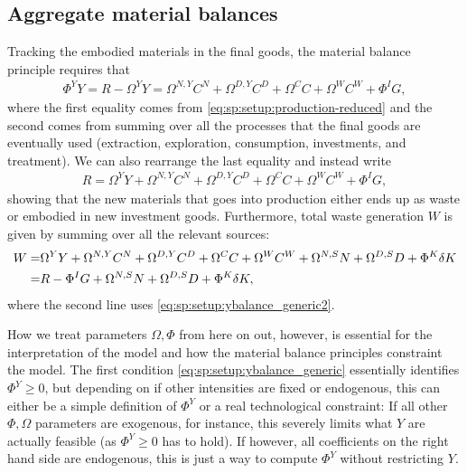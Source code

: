 \subsection{Aggregate material balances}
\label{sec:sp:setup:aggregatematerial}
Tracking the embodied materials in the final goods, the material balance principle requires that
\begin{align}
    \Phi^Y Y = R - \Omega^Y Y = \Omega^{N,Y}C^N + \Omega^{D,Y}C^D + \Omega^C C + \Omega^W C^W +\Phi^I G, \label{eq:sp:setup:ybalance_generic}
\end{align}
where the first equality comes from \eqref{eq:sp:setup:production-reduced} and the second comes from summing over all the processes that the final goods are eventually used (extraction, exploration, consumption, investments, and treatment). We can also rearrange the last equality and instead write
\begin{align}
    R =  \Omega^Y Y + \Omega^{N,Y}C^N + \Omega^{D,Y}C^D + \Omega^C C + \Omega^W C^W + \Phi^I G \label{eq:sp:setup:ybalance_generic2},
\end{align}
showing that the new materials that goes into production either ends up as waste or embodied in new investment goods. Furthermore, total waste generation $W$ is given by summing over all the relevant sources:
\begin{align}
    W =& \Omega^Y Y + \Omega^{N,Y}C^N + \Omega^{D,Y}C^D + \Omega^C C + \Omega^W C^W + \Omega^{N,S}N + \Omega^{D,S}D + \Phi^K \delta K \notag \\
    =& R - \Phi^I G + \Omega^{N,S}N + \Omega^{D,S}D + \Phi^K\delta K,
    \label{eq:sp:setup:totalwaste_generic}
\end{align}
where the second line uses \eqref{eq:sp:setup:ybalance_generic2}. 



\bigskip
How we treat parameters $\Omega, \Phi$ from here on out, however, is essential for the interpretation of the model and how the material balance principles constraint the model. The first condition \eqref{eq:sp:setup:ybalance_generic} essentially identifies $\Phi^Y\geq0$, but depending on if other intensities are fixed or endogenous, this can either be a simple definition of $\Phi^Y$ or a real technological constraint: If all other $\Phi, \Omega$ parameters are exogenous, for instance, this severely limits what $Y$ are actually feasible (as $\Phi^Y \geq 0$ has to hold). If however, all coefficients on the right hand side are endogenous, this is just a way to compute $\Phi^Y$ without restricting $Y$. 





